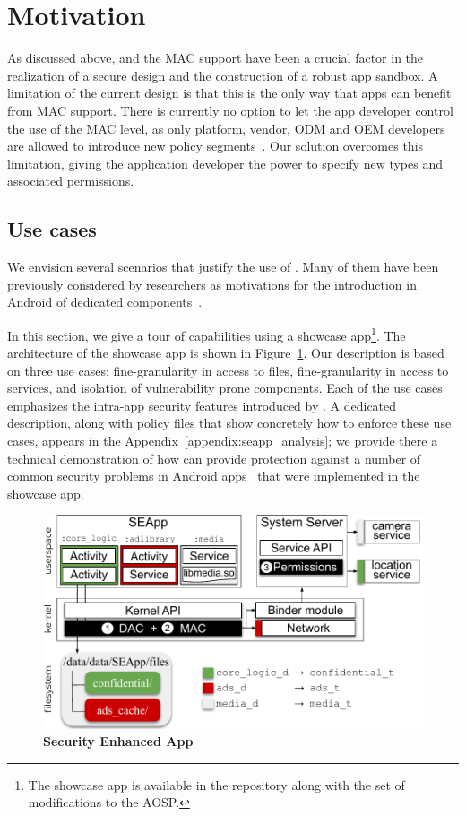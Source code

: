 \section{Motivation}\label{sect:seapp_motiv}

As discussed above, \sel and the MAC support have been a crucial
factor in the realization of a secure design and the construction of a
robust app sandbox.  A limitation of the current design is that this
is the only way that apps can benefit from MAC support.  There is
currently no option to let the app developer control the use of the
MAC level, as only platform, vendor, ODM and OEM developers are
allowed to introduce new policy
segments~\cite{seapp_sea_compatibility}.  Our solution overcomes this
limitation, giving the application developer the power to specify new
\sel types and associated permissions.

\subsection{Use cases}\label{sect:seapp_use-cases}
We envision several scenarios that justify the use of \pap.  Many of
them have been previously considered by researchers as motivations for
the introduction in Android of dedicated
components~\cite{seapp_10.1145/2976749.2978333,
  seapp_10.1145/3292006.3300027, seapp_10.1145/3133956.3134064}.

In this section, we give a tour of \pap capabilities using a showcase
app\footnote{The showcase app is available in the \pap repository
  along with the set of modifications to the AOSP.}.  The architecture
of the showcase app is shown in Figure~\ref{fig:seapp_showcase}. Our
description is based on three use cases: fine-granularity in access to
files, fine-granularity in access to services, and isolation of
vulnerability prone components.  Each of the use cases emphasizes the
intra-app security features introduced by \pap.  A dedicated
description, along with policy files that show concretely how to
enforce these use cases, appears in the
Appendix~\ref{appendix:seapp_analysis}; we provide there a technical
demonstration of how \pap can provide protection against a number of
common security problems in Android
apps~\cite{seapp_common_play_protect_vulnerabilites} that were
implemented in the showcase app.

\begin{figure}[h]
	\centering
	\includegraphics[width=0.8\columnwidth]{chapters/seapp/figs/seapp_showcase_app}
	\caption{\label{fig:seapp_showcase} \bf Security Enhanced App}
\end{figure}

